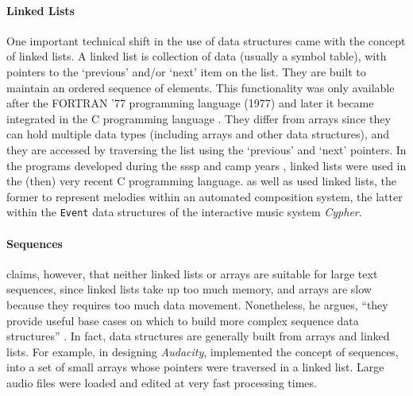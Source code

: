 \paragraph{Linked Lists}
\label{computer:linked}
One important technical shift in the use of data structures came with the concept of linked lists. A linked list is collection of data (usually a symbol table), with pointers to the `previous' and/or `next' item on the list. They are built to maintain an ordered sequence of elements. This functionality was only available after the FORTRAN '77 programming language (1977) and later it became integrated in the C programming language \parencite{kernighan_c_1978}. They differ from arrays since they can hold multiple data types (including arrays and other data structures), and they are accessed by traversing the list using the `previous' and `next' pointers. In the programs developed during the \gls{sssp} and \gls{camp} years , linked lists were used in the (then) very recent C programming language. \textcite{icmc/bbp2372.1985.040} as well as \textcite{Row92:Int} used linked lists, the former to represent melodies within an automated composition system, the latter within the \texttt{Event} data structures of the interactive music system \textit{Cypher}.

\paragraph{Sequences}
\label{computer:audacity}
\textcite{crowley98} claims, however, that neither linked lists or arrays are suitable for large text sequences, since linked lists take up too much memory, and arrays are slow because they requires too much data movement. Nonetheless, he argues, ``they provide useful base cases on which to build more complex sequence data structures'' \parencite{crowley98}. In fact, data structures are generally built from arrays and linked lists. For example, in designing \textit{Audacity}, \textcite{icmc/bbp2372.2001.051} implemented the concept of sequences, into a set of small arrays whose pointers were traversed in a linked list. Large audio files were loaded and edited at very fast processing times.
